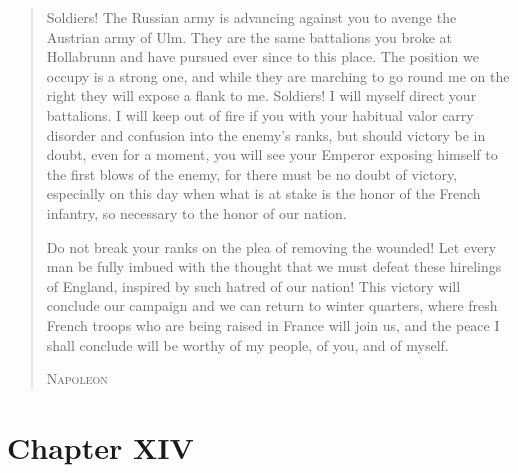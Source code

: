 \begin{quote} \calli
Soldiers! The Russian army is advancing against you
to avenge the Austrian army of Ulm. They are the same battalions
you broke at Hollabrunn and have pursued ever since to this
place. The position we occupy is a strong one, and while they are
marching to go round me on the right they will expose a flank to
me. Soldiers! I will myself direct your battalions. I will keep
out of fire if you with your habitual valor carry disorder and
confusion into the enemy's ranks, but should victory be in doubt,
even for a moment, you will see your Emperor exposing himself to
the first blows of the enemy, for there must be no doubt of
victory, especially on this day when what is at stake is the
honor of the French infantry, so necessary to the honor of our
nation.

Do not break your ranks on the plea of removing the wounded! Let
every man be fully imbued with the thought that we must defeat
these hirelings of England, inspired by such hatred of our
nation! This victory will conclude our campaign and we can return
to winter quarters, where fresh French troops who are being
raised in France will join us, and the peace I shall conclude
will be worthy of my people, of you, and of myself.

\textsc{Napoleon}
\end{quote}


\chapter*{Chapter XIV}
\ifaudio     
{} 
\fi

